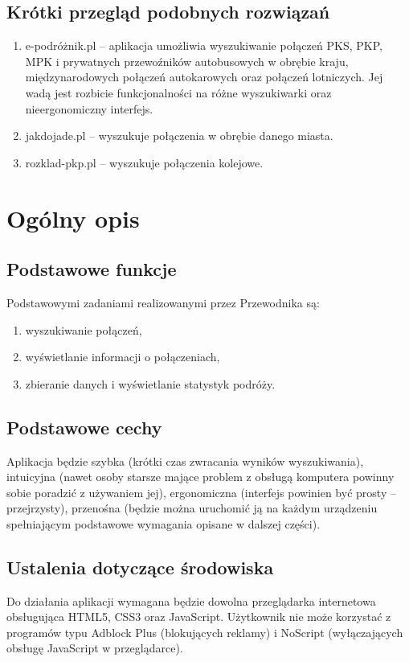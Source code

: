 \documentclass[12pt,a4paper]{report}
\begin{document}
\subsection{Krótki przegląd podobnych rozwiązań}
\begin{enumerate}
	\item e-podróżnik.pl -- aplikacja umożliwia wyszukiwanie połączeń PKS, PKP, MPK i prywatnych przewoźników autobusowych w obrębie kraju, międzynarodowych połączeń autokarowych oraz połączeń lotniczych. Jej wadą jest rozbicie funkcjonalności na różne wyszukiwarki oraz nieergonomiczny interfejs.
	\item jakdojade.pl -- wyszukuje połączenia w obrębie danego miasta.
	\item rozklad-pkp.pl -- wyszukuje połączenia kolejowe.
\end{enumerate}
\newpage
\section{Ogólny opis}
\subsection{Podstawowe funkcje}
	Podstawowymi zadaniami realizowanymi przez Przewodnika są:
	\begin{enumerate}
	 	\item wyszukiwanie połączeń,
	 	\item wyświetlanie informacji o połączeniach,
	 	\item zbieranie danych i wyświetlanie statystyk podróży.
	\end{enumerate}
\subsection{Podstawowe cechy}
	Aplikacja będzie szybka (krótki czas zwracania wyników wyszukiwania), intuicyjna (nawet osoby starsze mające problem z obsługą komputera powinny sobie poradzić z używaniem jej), ergonomiczna (interfejs powinien być prosty -- przejrzysty), przenośna (będzie można uruchomić ją na każdym urządzeniu spełniającym podstawowe wymagania opisane w dalszej części).
\subsection{Ustalenia dotyczące środowiska}
	Do działania aplikacji wymagana będzie dowolna przeglądarka internetowa obsługująca HTML5, CSS3 oraz JavaScript. Użytkownik nie może korzystać z programów typu Adblock Plus (blokujących reklamy) i NoScript (wyłączających obsługę JavaScript w przeglądarce).
\end{document}
